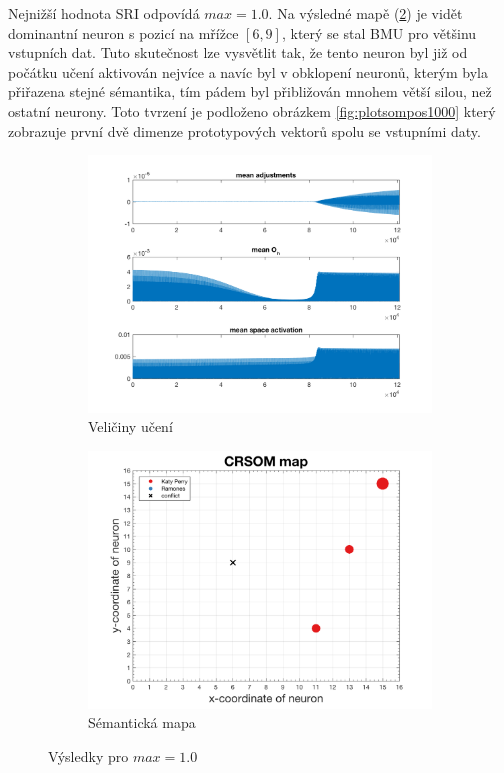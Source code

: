 \documentclass[thesis=M,czech]{FITthesis}[2012/06/26]
\begin{document}
Nejnižší hodnota SRI odpovídá $max=1.0$. Na výsledné mapě (\ref{fig:map1000}) je vidět dominantní neuron s pozicí na mřížce $[6,9]$, který se stal BMU pro většinu vstupních dat. Tuto skutečnost lze vysvětlit tak, že tento neuron byl již od počátku učení aktivován nejvíce a navíc byl v obklopení neuronů, kterým byla přiřazena stejné sémantika, tím pádem byl přibližován mnohem větší silou, než ostatní neurony. Toto tvrzení je podloženo obrázkem \ref{fig:plotsompos1000} který zobrazuje první dvě dimenze prototypových vektorů spolu se vstupními daty.

\begin{figure}
\centering
\begin{subfigure}{.5\textwidth}
  \centering
  \includegraphics[width=.99\linewidth]{norm-learnattrs1000.png}
  \caption{Veličiny učení}
  \label{fig:attrs1000}
\end{subfigure}%
\begin{subfigure}{.5\textwidth}
  \centering
  \includegraphics[width=.99\linewidth]{exp_kp_ram_1000_crsom.png}
  \caption{Sémantická mapa}
  \label{fig:map1000}
\end{subfigure}
\caption{Výsledky pro $max=1.0$}
\label{fig:res1000}
\end{figure}
\end{document}

